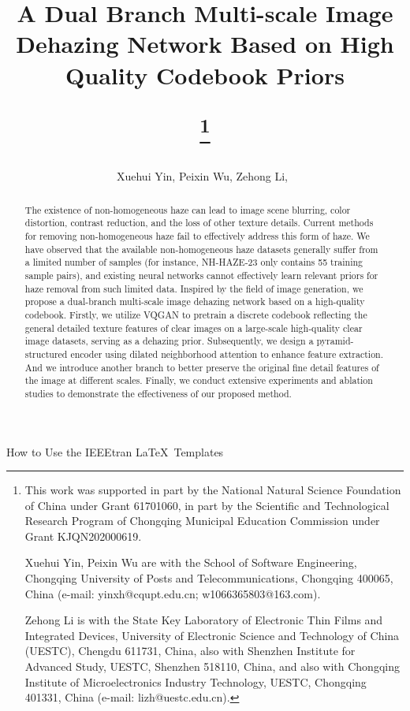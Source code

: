 \documentclass[lettersize,journal]{IEEEtran}
\begin{document}
\title{A Dual Branch Multi-scale Image Dehazing Network Based on High Quality Codebook Priors
\author{Xuehui Yin, Peixin Wu, Zehong Li,~}
\thanks{This work was supported in part by the National Natural Science Foundation of China under Grant 61701060, in part by the Scientific and Technological Research Program of Chongqing Municipal Education Commission under Grant KJQN202000619.
	
Xuehui Yin, Peixin Wu are with the School of Software Engineering, Chongqing University of Posts and Telecommunications, Chongqing 400065, China (e-mail: yinxh@cqupt.edu.cn; w1066365803@163.com). 

Zehong Li is with the State Key Laboratory of Electronic Thin Films and Integrated Devices, University of Electronic Science and Technology of China (UESTC), Chengdu 611731, China, also with Shenzhen Institute for Advanced Study, UESTC, Shenzhen 518110, China, and also with Chongqing Institute of Microelectronics Industry Technology, UESTC, Chongqing 401331, China (e-mail: lizh@uestc.edu.cn).
}}

%
{How to Use the IEEEtran \LaTeX \ Templates}

\maketitle

\begin{abstract}
The existence of non-homogeneous haze can lead to image scene blurring, color distortion, contrast reduction, and the loss of other texture details. Current methods for removing non-homogeneous haze fail to effectively address this form of haze. We have observed that the available non-homogeneous haze datasets generally suffer from a limited number of samples (for instance, NH-HAZE-23 only contains 55 training sample pairs), and existing neural networks cannot effectively learn relevant priors for haze removal from such limited data. Inspired by the field of image generation, we propose a dual-branch multi-scale image dehazing network based on a high-quality codebook. Firstly, we utilize VQGAN to pretrain a discrete codebook reflecting the general detailed texture features of clear images on a large-scale high-quality clear image datasets, serving as a dehazing prior. Subsequently, we design a pyramid-structured encoder using dilated neighborhood attention to enhance feature extraction. And we introduce another branch to better preserve the original fine detail features of the image at different scales. Finally, we conduct extensive experiments and ablation studies to demonstrate the effectiveness of our proposed method.
\end{abstract}
\end{document}
